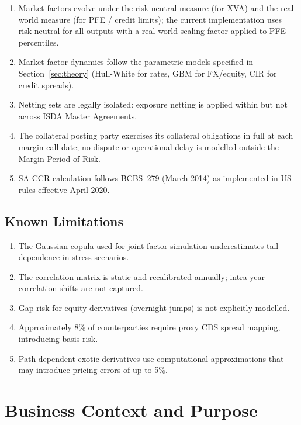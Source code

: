 \documentclass[11pt,a4paper]{article}
\begin{document}
\begin{enumerate}[noitemsep]
  \item Market factors evolve under the risk-neutral measure (for XVA) and the
        real-world measure (for PFE / credit limits); the current implementation
        uses risk-neutral for all outputs with a real-world scaling factor
        applied to PFE percentiles.
  \item Market factor dynamics follow the parametric models specified in
        Section~\ref{sec:theory} (Hull-White for rates, GBM for FX/equity, CIR
        for credit spreads).
  \item Netting sets are legally isolated: exposure netting is applied within
        but not across ISDA Master Agreements.
  \item The collateral posting party exercises its collateral obligations in
        full at each margin call date; no dispute or operational delay is
        modelled outside the Margin Period of Risk.
  \item SA-CCR calculation follows BCBS~279 (March 2014) as implemented in
        US rules effective April 2020.
\end{enumerate}

\subsection{Known Limitations}

\begin{enumerate}[noitemsep]
  \item The Gaussian copula used for joint factor simulation underestimates
        tail dependence in stress scenarios.
  \item The correlation matrix is static and recalibrated annually; intra-year
        correlation shifts are not captured.
  \item Gap risk for equity derivatives (overnight jumps) is not explicitly
        modelled.
  \item Approximately 8\% of counterparties require proxy CDS spread mapping,
        introducing basis risk.
  \item Path-dependent exotic derivatives use computational approximations that
        may introduce pricing errors of up to 5\%.
\end{enumerate}

\section{Business Context and Purpose}
\end{document}
